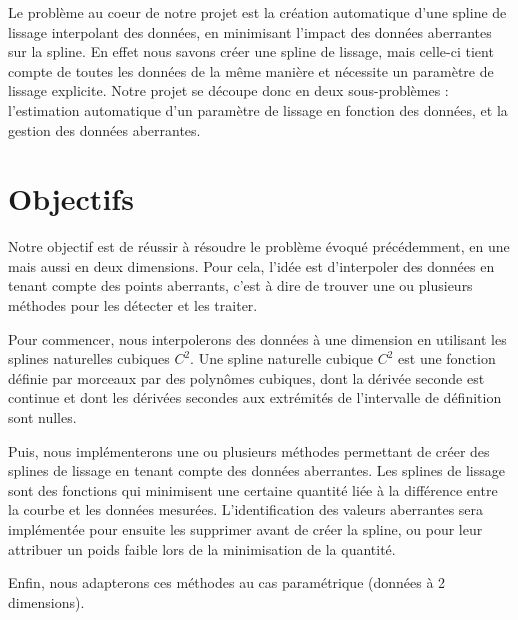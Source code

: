 \documentclass[a4paper,12pt]{article}
\begin{document}
Le problème au coeur de notre projet est la création automatique d'une spline de lissage interpolant des données, en minimisant l'impact des données aberrantes sur la spline. En effet nous savons créer une spline de lissage, mais celle-ci tient compte de toutes les données de la même manière et nécessite un paramètre de lissage explicite.
Notre projet se découpe donc en deux sous-problèmes : l'estimation automatique d'un paramètre de lissage en fonction des données, et la gestion des données aberrantes.

\newpage
\section{Objectifs}

Notre objectif est de réussir à résoudre le problème évoqué précédemment, en une mais aussi en deux dimensions. Pour cela, l'idée est d'interpoler des données en tenant compte des points aberrants, c'est à dire de trouver une ou plusieurs méthodes pour les détecter et les traiter.

Pour commencer, nous interpolerons des données à une dimension en utilisant les splines naturelles cubiques $C^2$. Une spline naturelle cubique $C^2$ est une fonction définie par morceaux par des polynômes cubiques, dont la dérivée seconde est continue et dont les dérivées secondes aux extrémités de l'intervalle de définition sont nulles. 

Puis, nous implémenterons une ou plusieurs méthodes permettant de créer des splines de lissage en tenant compte des données aberrantes. Les splines de lissage sont des fonctions qui minimisent une certaine quantité liée à la différence entre la courbe et les données mesurées. L'identification des valeurs aberrantes sera implémentée pour ensuite les supprimer avant de créer la spline, ou pour leur attribuer un poids faible lors de la minimisation de la quantité.

Enfin, nous adapterons ces méthodes au cas paramétrique (données à 2 dimensions).

\newpage 
\end{document}
